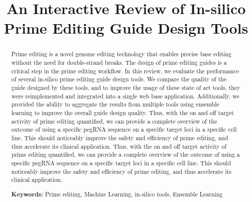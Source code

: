 \documentclass[12pt]{article}
\title{An Interactive Review of In-silico Prime Editing Guide Design Tools}
\begin{document}
\date{}
\maketitle

\begin{abstract}
    Prime editing is a novel genome editing technology that enables precise base editing without the need for double-strand breaks. The design of prime editing guides is a critical step in the prime editing workflow. In this review, we evaluate the performance of several in-silico prime editing guide design tools. We compare the quality of the guide designed by these tools, and to improve the usage of these state of art tools, they were reimplemented and integrated into a single web base application. Additionally, we provided the ability to aggregate the results from multiple tools using ensemble learning to improve the overall guide design quality.
    Thus, with the on and off target activity of prime editing quantified, we can provide a complete overview of the outcome of using a specific pegRNA sequence on a specific target loci in a specific cell line. This should noticeably improve the safety and efficiency of prime editing, and thus accelerate its clinical application.
    Thus, with the on and off target activity of prime editing quantified, we can provide a complete overview of the outcome of using a specific pegRNA sequence on a specific target loci in a specific cell line. This should noticeably improve the safety and efficiency of prime editing, and thus accelerate its clinical application.

    \textbf{Keywords:} Prime editing, Machine Learning, in-silico tools, Ensemble Learning
\end{abstract}

\newpage






\newpage
\appendix



\newpage
\printbibliography
\end{document}
